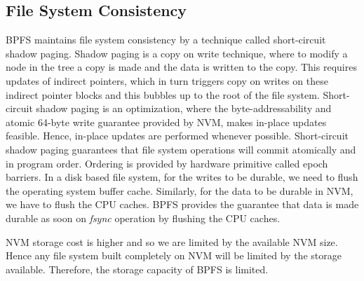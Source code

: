 \subsection{File System Consistency}
BPFS maintains file system consistency by a technique called short-circuit shadow paging. Shadow paging is a copy on write technique, where to modify a node in the tree a copy is made and the data is written to the copy. This requires updates of indirect pointers, which in turn triggers copy on writes on these indirect pointer blocks and this bubbles up to the root of the file system. Short-circuit shadow paging is an optimization, where the byte-addressability and atomic 64-byte write guarantee provided by NVM, makes in-place updates feasible. Hence, in-place updates are performed whenever possible. Short-circuit shadow paging guarantees that file system operations will commit atomically and in program order. Ordering is provided by hardware primitive called epoch barriers. In a disk based file system, for the writes to be durable, we need to flush the operating system buffer cache. Similarly, for the data to be durable in NVM, we have to flush the CPU caches. BPFS provides the guarantee that data is made durable as soon on \textit{fsync} operation by flushing the CPU caches.


NVM storage cost is higher and so we are limited by the available NVM size. Hence any file system built completely on NVM will be limited by the storage available. Therefore, the storage capacity of BPFS is limited.
